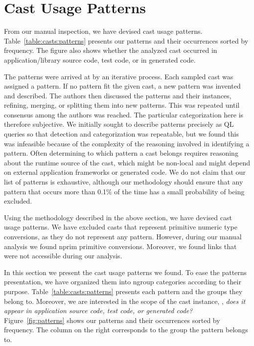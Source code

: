 
\section{Cast Usage Patterns}
\label{sec:casts:patterns}

From our manual inspection,
we have devised \nPattern{} cast usage patterns.
Table~\ref{table:casts:patterns} presents our patterns and their occurrences sorted by frequency.
The figure also shows whether the analyzed cast occurred in
application/library source code, test code, or in generated code.

The patterns were arrived at by an iterative process. Each sampled cast was
assigned a pattern. If no pattern fit the given cast, a new pattern was
invented and described.
The authors then discussed the patterns and their instances, refining,
merging, or splitting them into new patterns. This was repeated until
consensus among the authors was reached.
The particular categorization here is therefore subjective.
%
We initially sought to describe patterns precisely as QL queries so that
detection and categorization was repeatable, but we found
this was infeasible because of the complexity of the reasoning involved in
identifying a pattern. Often determining to which pattern a cast belongs
requires reasoning about the runtime source of the cast, which might be
non-local and might depend on external application frameworks or generated
code.
%
We do not claim that our list of patterns is exhaustive, although our
methodology should ensure that any pattern that occurs more than 0.1\% of the
time has a small probability of being excluded.


Using the methodology described in the above section,
we have devised \nPattern{} cast usage patterns.
We have excluded casts that represent primitive numeric type conversions,
as they do not represent any pattern.
However, during our manual analysis we found nprim{} primitive conversions.
Moreover, we found \nBrokenLink{} links that were not accessible during our analysis.

In this section we present the cast usage patterns we found.
To ease the patterns presentation,
we have organized them into ngroup{} categories according to their purpose.
Table~\ref{table:casts:patterns} presents each pattern and the groups they belong to.
Moreover, we are interested in the scope of the cast instance,
\ie, \emph{does it appear in application source code, test code, or generated code?}
Figure~\ref{fig:patterns} shows our patterns and their occurrences sorted by frequency.
The column on the right corresponds to the group the pattern belongs to.

